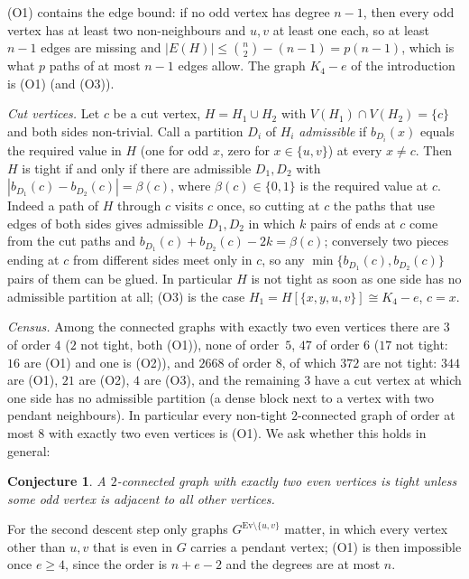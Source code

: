 \documentclass[11pt]{amsart}
\newtheorem{conjecture}[theorem]{Conjecture}
\theoremstyle{definition}
\newcommand{\Ev}{\mathrm{Ev}}
\begin{document}
(O1) contains the edge bound: if no odd vertex has degree $n-1$, then every odd vertex has at
least two non-neighbours and $u,v$ at least one each, so at least $n-1$ edges are missing and
$|E(H)|\le\binom n2-(n-1)=p(n-1)$, which is what $p$ paths of at most $n-1$ edges allow. The
graph $K_4-e$ of the introduction is (O1) (and (O3)).

\emph{Cut vertices.} Let $c$ be a cut vertex, $H=H_1\cup H_2$ with $V(H_1)\cap V(H_2)=\{c\}$ and
both sides non-trivial. Call a partition $D_i$ of $H_i$ \emph{admissible} if $b_{D_i}(x)$ equals
the required value in $H$ (one for odd $x$, zero for $x\in\{u,v\}$) at every $x\ne c$. Then $H$ is
tight if and only if there are admissible $D_1,D_2$ with
$|b_{D_1}(c)-b_{D_2}(c)|=\beta(c)$, where $\beta(c)\in\{0,1\}$ is the required value at $c$.
Indeed a path of $H$ through $c$ visits $c$ once, so cutting at $c$ the paths that use edges of
both sides gives admissible $D_1,D_2$ in which $k$ pairs of ends at $c$ come from the cut paths and
$b_{D_1}(c)+b_{D_2}(c)-2k=\beta(c)$; conversely two pieces ending at $c$ from different sides meet
only in $c$, so any $\min\{b_{D_1}(c),b_{D_2}(c)\}$ pairs of them can be glued. In particular $H$ is
not tight as soon as one side has no admissible partition at all; (O3) is the case
$H_1=H[\{x,y,u,v\}]\cong K_4-e$, $c=x$.

\emph{Census.} Among the connected graphs with exactly two even vertices there are $3$ of order
$4$ ($2$ not tight, both (O1)), none of order~$5$, $47$ of order $6$ ($17$ not tight: $16$ are (O1) and one
is (O2)), and $2668$ of order $8$, of which $372$ are not tight: $344$ are (O1), $21$ are (O2), $4$
are (O3), and the remaining $3$ have a cut vertex at which one side has no admissible partition
(a dense block next to a vertex with two pendant neighbours). In particular every non-tight
$2$-connected graph of order at most $8$ with exactly two even vertices is (O1). We ask whether
this holds in general:

\begin{conjecture}\label{conj:twoeven}
A $2$-connected graph with exactly two even vertices is tight unless some odd vertex is adjacent
to all other vertices.
\end{conjecture}

For the second descent step only graphs $G^{\Ev\setminus\{u,v\}}$ matter, in which every vertex other
than $u,v$ that is even in $G$ carries a pendant vertex; (O1) is then impossible once $e\ge4$, since
the order is $n+e-2$ and the degrees are at most $n$.
\end{document}
